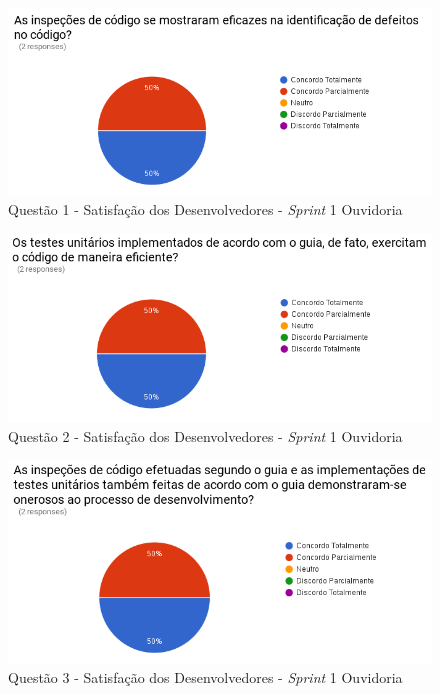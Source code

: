 \begin{figure}[!h]
\includegraphics[width=\textwidth]{figuras/s1o.png}
\caption{Questão 1 - Satisfação dos Desenvolvedores - \textit{Sprint} 1 Ouvidoria}
\end{figure}

\begin{figure}[!h]
\includegraphics[width=\textwidth]{figuras/s2o.png}
\caption{Questão 2 - Satisfação dos Desenvolvedores - \textit{Sprint} 1 Ouvidoria}
\end{figure}

\begin{figure}[!h]
\includegraphics[width=\textwidth]{figuras/s3o.png}
\caption{Questão 3 - Satisfação dos Desenvolvedores - \textit{Sprint} 1 Ouvidoria}
\end{figure}

